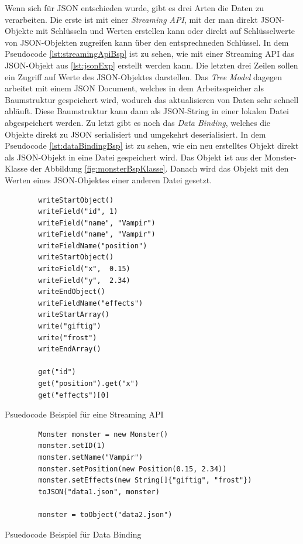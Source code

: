 Wenn sich für JSON entschieden wurde, gibt es drei Arten die Daten zu verarbeiten. Die erste ist mit einer \textit{Streaming API}, mit der man direkt JSON-Objekte mit Schlüsseln und Werten erstellen kann oder direkt auf Schlüsselwerte von JSON-Objekten zugreifen kann über den entsprechneden Schlüssel. In dem Pseudocode \ref{lst:streamingApiBsp} ist zu sehen, wie mit einer Streaming API das JSON-Objekt aus \ref{lst:jsonExp} erstellt werden kann. Die letzten drei Zeilen sollen ein Zugriff auf Werte des JSON-Objektes darstellen.\cite{tutorialspointJacksonStreaming} Das \textit{Tree Model} dagegen arbeitet mit einem JSON Document, welches in dem Arbeitsspeicher als Baumstruktur gespeichert wird, wodurch das aktualisieren von Daten sehr schnell abläuft. Diese Baumstruktur kann dann als JSON-String in einer lokalen Datei abgespeichert werden. Zu letzt gibt es noch das \textit{Data Binding}, welches die Objekte direkt zu JSON serialisiert und umgekehrt deserialisiert. In dem Pseudocode \ref{lst:dataBindingBsp} ist zu sehen, wie ein neu erstelltes Objekt direkt als JSON-Objekt in eine Datei gespeichert wird. Das Objekt ist aus der Monster-Klasse der Abbildung \ref{fig:monsterBspKlasse}. Danach wird das Objekt mit den Werten eines JSON-Objektes einer anderen Datei gesetzt.\cite{tutorialspointJacksonData}\cite{tutorialspointJacksonOverview}

\begin{listing}[htp]
    \begin{verbatim} 
        writeStartObject()
        writeField("id", 1)
        writeField("name", "Vampir")
        writeField("name", "Vampir")
        writeFieldName("position")
        writeStartObject()
        writeField("x",  0.15) 
        writeField("y",  2.34) 
        writeEndObject()
        writeFieldName("effects")
        writeStartArray()
        write("giftig") 
        write("frost")
        writeEndArray()

        get("id")
        get("position").get("x")
        get("effects")[0]
    \end{verbatim}
    \caption{Psuedocode Beispiel für eine Streaming API}
    \label{lst:streamingApiBsp}
\end{listing}

\begin{listing}[htp]
    \begin{verbatim} 
        Monster monster = new Monster()
        monster.setID(1)
        monster.setName("Vampir")
        monster.setPosition(new Position(0.15, 2.34))
        monster.setEffects(new String[]{"giftig", "frost"})
        toJSON("data1.json", monster)

        monster = toObject("data2.json")
    \end{verbatim}
    \caption{Psuedocode Beispiel für Data Binding}
    \label{lst:dataBindingBsp}
\end{listing}

